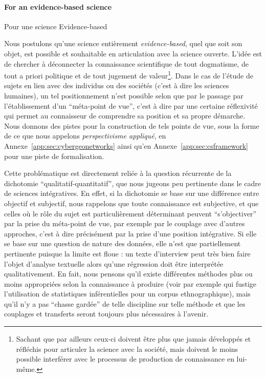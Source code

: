 \paragraph{For an evidence-based science}{Pour une science Evidence-based}

Nous postulons qu'une science entièrement \emph{evidence-based}, quel que soit son objet, est possible et souhaitable en articulation avec la science ouverte. L'idée est de chercher à déconnecter la connaissance scientifique de tout dogmatisme, de tout a priori politique et de tout jugement de valeur\footnote{Sachant que par ailleurs ceux-ci doivent être plus que jamais développés et réfléchis pour articuler la science avec la société, mais doivent le moins possible interférer avec le processus de production de connaissance en lui-même.}. Dans le cas de l'étude de sujets en lien avec des individus ou des sociétés (c'est à dire les sciences humaines), un tel positionnement n'est possible selon \cite{morin1991methode} que par le passage par l'établissement d'un ``méta-point de vue'', c'est à dire par une certaine réflexivité qui permet au connaisseur de comprendre sa position et sa propre démarche. Nous donnons des pistes pour la construction de tels points de vue, sous la forme de ce que nous appelons \emph{perspectivisme appliqué}, en Annexe~\ref{app:sec:cybergeonetworks} ainsi qu'en Annexe~\ref{app:sec:csframework} pour une piste de formalisation.


Cette problématique est directement reliée à la question récurrente de la dichotomie ``qualitatif-quantitatif'', que nous jugeons peu pertinente dans le cadre de sciences intégratives. En effet, si la dichotomie se base sur une différence entre objectif et subjectif, nous rappelons que toute connaissance est subjective, et que celles où le rôle du sujet est particulièrement déterminant peuvent ``s'objectiver'' par la prise du méta-point de vue, par exemple par le couplage avec d'autres approches, c'est à dire précisément par la prise d'une position intégrative. Si elle se base sur une question de nature des données, elle n'est que partiellement pertinente puisque la limite est floue : un texte d'interview peut très bien faire l'objet d'analyse textuelle alors qu'une régression doit être interprétée qualitativement. En fait, nous pensons qu'il existe différentes méthodes plus ou moins appropriées selon la connaissance à produire (voir par exemple \cite{gros2017quantifier} qui fustige l'utilisation de statistiques inférentielles pour un corpus ethnographique), mais qu'il n'y a pas ``chasse gardée'' de telle discipline sur telle méthode et que les couplages et transferts seront toujours plus nécessaires à l'avenir.


